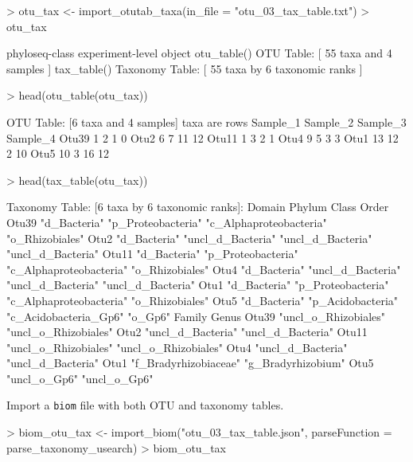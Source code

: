\documentclass{article}
\begin{document}
\begin{Schunk}
\begin{Sinput}
> otu_tax <- import_otutab_taxa(in_file = "otu_03_tax_table.txt")
> otu_tax
\end{Sinput}
\begin{Soutput}
phyloseq-class experiment-level object
otu_table()   OTU Table:         [ 55 taxa and 4 samples ]
tax_table()   Taxonomy Table:    [ 55 taxa by 6 taxonomic ranks ]
\end{Soutput}
\begin{Sinput}
> head(otu_table(otu_tax))
\end{Sinput}
\begin{Soutput}
OTU Table:          [6 taxa and 4 samples]
                     taxa are rows
      Sample_1 Sample_2 Sample_3 Sample_4
Otu39        1        2        1        0
Otu2         6        7       11       12
Otu11        1        3        2        1
Otu4         9        5        3        3
Otu1        13       12        2       10
Otu5        10        3       16       12
\end{Soutput}
\begin{Sinput}
> head(tax_table(otu_tax))
\end{Sinput}
\begin{Soutput}
Taxonomy Table:     [6 taxa by 6 taxonomic ranks]:
      Domain       Phylum             Class                   Order            
Otu39 "d_Bacteria" "p_Proteobacteria" "c_Alphaproteobacteria" "o_Rhizobiales"  
Otu2  "d_Bacteria" "uncl_d_Bacteria"  "uncl_d_Bacteria"       "uncl_d_Bacteria"
Otu11 "d_Bacteria" "p_Proteobacteria" "c_Alphaproteobacteria" "o_Rhizobiales"  
Otu4  "d_Bacteria" "uncl_d_Bacteria"  "uncl_d_Bacteria"       "uncl_d_Bacteria"
Otu1  "d_Bacteria" "p_Proteobacteria" "c_Alphaproteobacteria" "o_Rhizobiales"  
Otu5  "d_Bacteria" "p_Acidobacteria"  "c_Acidobacteria_Gp6"   "o_Gp6"          
      Family                Genus               
Otu39 "uncl_o_Rhizobiales"  "uncl_o_Rhizobiales"
Otu2  "uncl_d_Bacteria"     "uncl_d_Bacteria"   
Otu11 "uncl_o_Rhizobiales"  "uncl_o_Rhizobiales"
Otu4  "uncl_d_Bacteria"     "uncl_d_Bacteria"   
Otu1  "f_Bradyrhizobiaceae" "g_Bradyrhizobium"  
Otu5  "uncl_o_Gp6"          "uncl_o_Gp6"        
\end{Soutput}
\end{Schunk}

Import a \texttt{biom} file with both OTU and taxonomy tables.  

\begin{Schunk}
\begin{Sinput}
> biom_otu_tax <- import_biom("otu_03_tax_table.json", parseFunction = parse_taxonomy_usearch)
> biom_otu_tax
\end{Sinput}
\end{Schunk}
\end{document}
